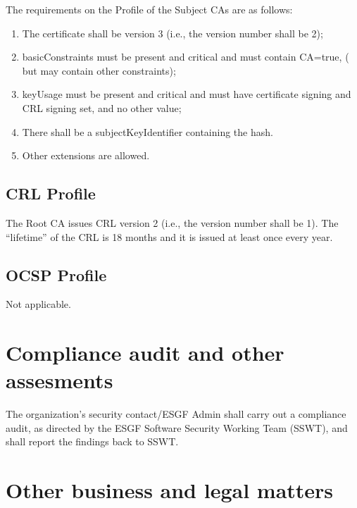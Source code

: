 The requirements on the Profile of the Subject CAs are as follows:

\begin{enumerate}
\item
  
  The certificate shall be version 3 (i.e., the version number shall be
  2);
  
\item
  
  basicConstraints must be present and critical and must contain
  CA=true, ( but may contain other constraints);
  
\item
  
  keyUsage must be present and critical and must have certificate
  signing and CRL signing set, and no other value;
  
\item
  
  There shall be a subjectKeyIdentifier containing the hash.
  
\item
  
  Other extensions are allowed.
  
\end{enumerate}

\subsection{CRL Profile}\label{crl-profile}

The Root CA issues CRL version 2 (i.e., the version number shall be 1).
The ``lifetime'' of the CRL is 18 months and it is issued at least once
every year.

\subsection{OCSP Profile}\label{ocsp-profile}

Not applicable.

\section{Compliance audit and other assesments}\label{compliance-audit-and-other-assessments}

The organization's security contact/ESGF Admin shall carry out a compliance audit, as directed by the ESGF Software Security Working Team (SSWT), and shall report the findings back to SSWT.

\section{Other business and legal matters}\label{other-business-and-legal-matters}


